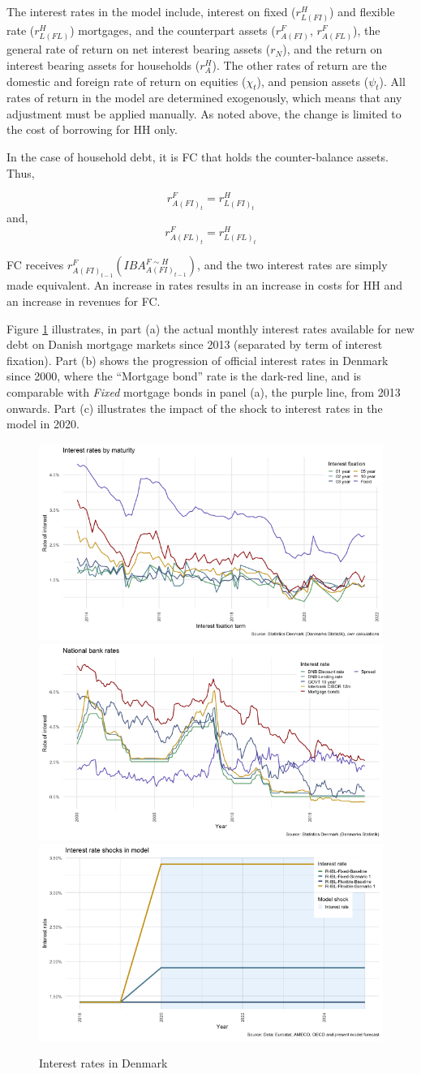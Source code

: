 \documentclass[
]{book}
\begin{document}
The interest rates in the model include, interest on fixed (\(r^H_{L(FI)}\)) and flexible rate (\(r^H_{L(FL)}\)) mortgages, and the counterpart assets (\(r^F_{A(FI)}\), \(r^F_{A(FL)}\)), the general rate of return on net interest bearing assets (\(r_{N}\)), and the return on interest bearing assets for households (\(r^H_{A}\)). The other rates of return are the domestic and foreign rate of return on equities (\(\chi _t\)), and pension assets (\(\psi _t\)). All rates of return in the model are determined exogenously, which means that any adjustment must be applied manually. As noted above, the change is limited to the cost of borrowing for HH only.

In the case of household debt, it is FC that holds the counter-balance assets. Thus,

\[r^F_{A(FI)_{t}} = r^H_{L(FI)_{t}}\]
and,
\[r^F_{A(FL)_{t}} = r^H_{L(FL)_{t}}\]

FC receives \(r^F_{A(FI)_{t-1}}(IBA^{F\sim H}_{A(FI)_{t-1}})\), and the two interest rates are simply made equivalent. An increase in rates results in an increase in costs for HH and an increase in revenues for FC.

Figure \ref{fig:dst-mortgage-debt-interest} illustrates, in part (a) the actual monthly interest rates available for new debt on Danish mortgage markets since 2013 (separated by term of interest fixation). Part (b) shows the progression of official interest rates in Denmark since 2000, where the ``Mortgage bond'' rate is the dark-red line, and is comparable with \emph{Fixed} mortgage bonds in panel (a), the purple line, from 2013 onwards. Part (c) illustrates the impact of the shock to interest rates in the model in 2020.

\begin{figure}[H]
\includegraphics[width=0.33\linewidth]{figures/dst-mortgage-debt-interest-1} \includegraphics[width=0.33\linewidth]{figures/dst-mortgage-debt-interest-2} \includegraphics[width=0.33\linewidth]{figures/dst-mortgage-debt-interest-3} \caption{Interest rates in Denmark}\label{fig:dst-mortgage-debt-interest}
\end{figure}
\end{document}
